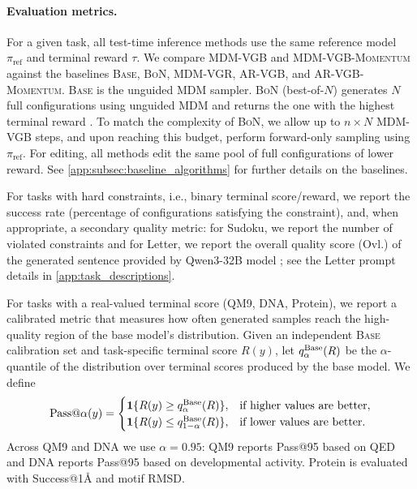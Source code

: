 \documentclass{article}
\numberwithin{theorem}{section}
\numberwithin{proposition}{section}
\numberwithin{corollary}{section}
\numberwithin{lemma}{section}
\numberwithin{conjecture}{section}
\numberwithin{remark}{section}
\numberwithin{definition}{section}
\numberwithin{assumption}{section}
\numberwithin{example}{section}
\providecommand{\base}{\pi_{\mathrm{ref}}}
\begin{document}
\vspace{-25pt}
\paragraph{Evaluation metrics.}
For a given task, all test-time inference methods use the same reference model \(\base\) and terminal reward \(\tau\).
We compare \textsc{MDM-VGB} and \textsc{MDM-VGB-Momentum} against the baselines \textsc{Base}, \textsc{BoN}, \textsc{MDM-VGR}, \textsc{AR-VGB}, and \textsc{AR-VGB-Momentum}. \textsc{Base} is the unguided MDM
sampler. \textsc{BoN} (best-of-$N$) generates \(N\) full configurations using unguided MDM and returns the one
with the highest terminal reward
\citep{brown2024large,huang2025bestofn}. To match the complexity of \textsc{BoN}, we allow up to \(n\times N\) MDM-VGB steps, and upon reaching this budget, perform forward-only sampling using
\(\base\). For editing, all methods edit the same pool of full
configurations of lower reward.
See \cref{app:subsec:baseline_algorithms} for further details on the baselines.


For tasks with hard constraints, i.e., binary terminal score/reward, we report the success rate (percentage of configurations satisfying the constraint), and, when appropriate, a secondary quality metric: for Sudoku, we report the number of violated constraints and for Letter, we report the overall quality score (Ovl.) of the generated sentence provided by Qwen3-32B model \citep{qwen2025qwen3}; see the Letter prompt details in \cref{app:task_descriptions}.

For tasks with a real-valued terminal score (QM9, DNA, Protein), we report a calibrated metric that measures how often generated samples reach the high-quality region of the base model's distribution. Given an
independent \textsc{Base} calibration set and task-specific terminal score \(R(y)\), let
\(q_\alpha^{\rm Base}(R)\) be the \(\alpha\)-quantile of the
distribution over terminal scores produced by the base model. We define
\begin{equation*}
    \mathrm{Pass@\alpha}(y)
    =
    \begin{cases}
        \mathbf 1\{R(y)\ge q_{\alpha}^{\rm Base}(R)\},
        & \text{if higher values are better},\\
        \mathbf 1\{R(y)\le q_{1-\alpha}^{\rm Base}(R)\},
        & \text{if lower values are better}.
    \end{cases}
\end{equation*}
Across QM9 and DNA we use \(\alpha=0.95\): QM9 reports Pass@95 based on QED and DNA reports Pass@95 based on developmental activity. Protein is evaluated with Success@1\AA{} and motif RMSD.
\end{document}
